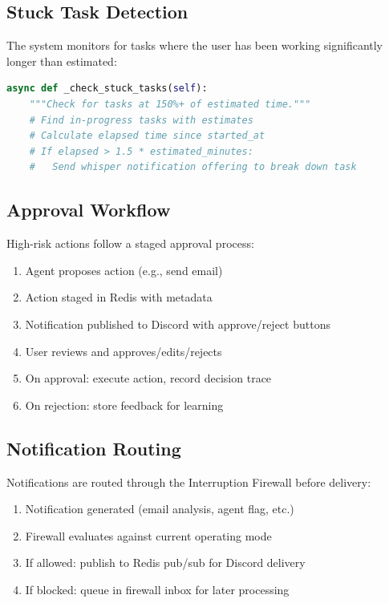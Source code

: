 \documentclass[11pt,a4paper]{article}
\begin{document}
\subsection{Stuck Task Detection}

The system monitors for tasks where the user has been working significantly longer than estimated:

\begin{lstlisting}[language=Python]
async def _check_stuck_tasks(self):
    """Check for tasks at 150%+ of estimated time."""
    # Find in-progress tasks with estimates
    # Calculate elapsed time since started_at
    # If elapsed > 1.5 * estimated_minutes:
    #   Send whisper notification offering to break down task
\end{lstlisting}

\subsection{Approval Workflow}

High-risk actions follow a staged approval process:

\begin{enumerate}
    \item Agent proposes action (e.g., send email)
    \item Action staged in Redis with metadata
    \item Notification published to Discord with approve/reject buttons
    \item User reviews and approves/edits/rejects
    \item On approval: execute action, record decision trace
    \item On rejection: store feedback for learning
\end{enumerate}

\subsection{Notification Routing}

Notifications are routed through the Interruption Firewall before delivery:

\begin{enumerate}
    \item Notification generated (email analysis, agent flag, etc.)
    \item Firewall evaluates against current operating mode
    \item If allowed: publish to Redis pub/sub for Discord delivery
    \item If blocked: queue in firewall inbox for later processing
\end{enumerate}
\end{document}
